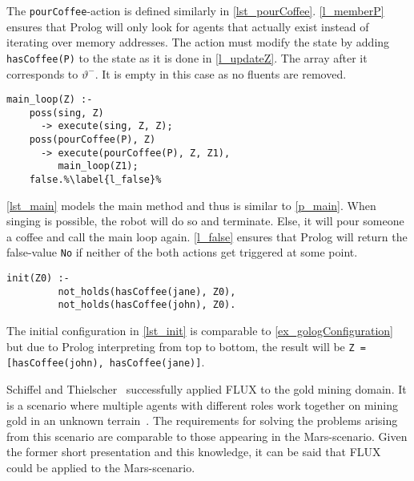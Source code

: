 The \texttt{pourCoffee}-action is defined similarly in \autoref{lst_pourCoffee}. \autoref{l_memberP} ensures that Prolog will only look for agents that actually exist instead of iterating over memory addresses. The action must modify the state by adding \texttt{hasCoffee(P)} to the state as it is done in \autoref{l_updateZ}. The array after it corresponds to $\vartheta^-$. It is empty in this case as no fluents are removed.
\begin{lstlisting}[firstnumber=10, caption={Main method which either tells the robot to sing or to pour coffee.}, label=lst_main]
  main_loop(Z) :-
    poss(sing, Z)
      -> execute(sing, Z, Z);
    poss(pourCoffee(P), Z)
      -> execute(pourCoffee(P), Z, Z1),
         main_loop(Z1);
    false.%\label{l_false}%
\end{lstlisting}
\autoref{lst_main} models the main method and thus is similar to \autoref{p_main}. When singing is possible, the robot will do so and terminate. Else, it will pour someone a coffee and call the main loop again. \autoref{l_false} ensures that Prolog will return the false-value \texttt{No} if neither of the both actions get triggered at some point.
\begin{lstlisting}[firstnumber=17, caption={Initial configuration.}, label=lst_init]
  init(Z0) :-
         not_holds(hasCoffee(jane), Z0),
         not_holds(hasCoffee(john), Z0).
\end{lstlisting}
The initial configuration in \autoref{lst_init} is comparable to \autoref{ex_gologConfiguration} but due to Prolog interpreting from top to bottom, the result will be \texttt{Z = [hasCoffee(john), hasCoffee(jane)]}.

Schiffel and Thielscher~\cite{schiffel_multi-agent_2007} successfully applied FLUX to the gold mining domain. It is a scenario where multiple agents with different roles work together on mining gold in an unknown terrain~\cite{schiffel_multi-agent_2007}. The requirements for solving the problems arising from this scenario are comparable to those appearing in the Mars-scenario. Given the former short presentation and this knowledge, it can be said that FLUX could be applied to the Mars-scenario.
